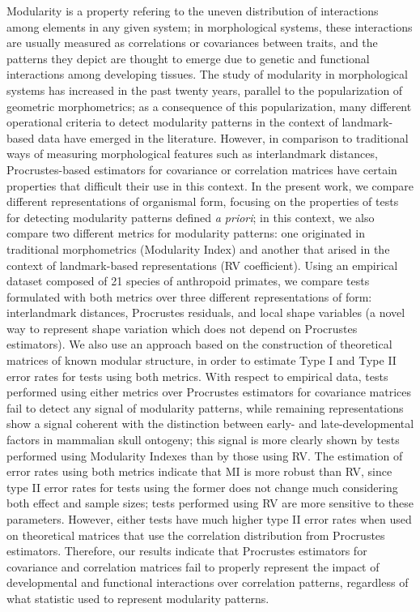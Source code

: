 \documentclass[12pt,]{article}
\begin{document}
Modularity is a property refering to the uneven distribution of
interactions among elements in any given system; in morphological
systems, these interactions are usually measured as correlations or
covariances between traits, and the patterns they depict are thought to
emerge due to genetic and functional interactions among developing
tissues. The study of modularity in morphological systems has increased
in the past twenty years, parallel to the popularization of geometric
morphometrics; as a consequence of this popularization, many different
operational criteria to detect modularity patterns in the context of
landmark-based data have emerged in the literature. However, in
comparison to traditional ways of measuring morphological features such
as interlandmark distances, Procrustes-based estimators for covariance
or correlation matrices have certain properties that difficult their use
in this context. In the present work, we compare different
representations of organismal form, focusing on the properties of tests
for detecting modularity patterns defined \emph{a priori}; in this
context, we also compare two different metrics for modularity patterns:
one originated in traditional morphometrics (Modularity Index) and
another that arised in the context of landmark-based representations (RV
coefficient). Using an empirical dataset composed of 21 species of
anthropoid primates, we compare tests formulated with both metrics over
three different representations of form: interlandmark distances,
Procrustes residuals, and local shape variables (a novel way to
represent shape variation which does not depend on Procrustes
estimators). We also use an approach based on the construction of
theoretical matrices of known modular structure, in order to estimate
Type I and Type II error rates for tests using both metrics. With
respect to empirical data, tests performed using either metrics over
Procrustes estimators for covariance matrices fail to detect any signal
of modularity patterns, while remaining representations show a signal
coherent with the distinction between early- and late-developmental
factors in mammalian skull ontogeny; this signal is more clearly shown
by tests performed using Modularity Indexes than by those using RV. The
estimation of error rates using both metrics indicate that MI is more
robust than RV, since type II error rates for tests using the former
does not change much considering both effect and sample sizes; tests
performed using RV are more sensitive to these parameters. However,
either tests have much higher type II error rates when used on
theoretical matrices that use the correlation distribution from
Procrustes estimators. Therefore, our results indicate that Procrustes
estimators for covariance and correlation matrices fail to properly
represent the impact of developmental and functional interactions over
correlation patterns, regardless of what statistic used to represent
modularity patterns.
\end{document}
